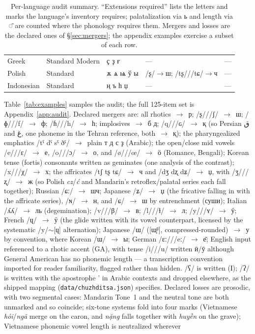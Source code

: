 \documentclass[11pt]{article}
\newcommand{\cz}[1]{{\chu #1}}
\newcommand{\ph}[1]{{\ipafont/#1/}}
\begin{document}
\begin{table}[ht]
\begin{tabular}{lllll}
Greek & Standard Modern & \cz{ҫ ҙ ғ} & — & — \\
Polish & Standard & \cz{ѫ ѧ ѩ ў ы} & \ph{ʂ}$\rightarrow$\cz{ш}; \ph{tʂ}/\ph{tɕ}$\rightarrow$\cz{ч} & — \\
Indonesian & Standard & \cz{ң ъ һ џ} & — & — \\
\bottomrule
\end{tabular}
\caption{Per-language audit summary. ``Extensions required'' lists the letters and marks the language's inventory requires; palatalization via \cz{ь} and length via \cz{◌̄} are counted where the phonology requires them. Mergers and losses are the declared ones of \S\ref{sec:mergers}; the appendix examples exercise a subset of each row.}
\label{tab:audit}
\end{table}
 Table~\ref{tab:examples} samples the audit; the full 125-item set is Appendix~\ref{app:audit}. Declared mergers\label{sec:mergers} are: all rhotics~$\rightarrow$~\cz{р}; \ph{ʂ}/\ph{ʃ}~$\rightarrow$~\cz{ш}; \ph{ɸ}/\ph{f}~$\rightarrow$~\cz{ф}; \ph{ɦ}/\ph{h}~$\rightarrow$~\cz{һ}; implosives~$\rightarrow$~\cz{б д}; \ph{q}/\ph{ɢ}~$\rightarrow$~\cz{қ} (so Persian {\ipafont ق} and {\ipafont غ}, one phoneme in the Tehran reference, both~$\rightarrow$~\cz{қ}); the pharyngealized emphatics \ph{tˤ dˤ sˤ ðˤ}~$\rightarrow$~plain \cz{т д с ҙ} (Arabic); the open/close mid vowels \ph{e}/\ph{ɛ}~$\rightarrow$~\cz{е}, \ph{o}/\ph{ɔ}~$\rightarrow$~\cz{о}, and \ph{ø}/\ph{œ}~$\rightarrow$~\cz{ӧ} (Romance, Bengali); Korean tense (fortis) consonants written as geminates (one analysis of the contrast); \ph{x}/\ph{χ}~$\rightarrow$~\cz{х}; the affricates \ph{tʃ tʂ tɕ}~$\rightarrow$~\cz{ч} and \ph{dʒ dʐ dʑ}~$\rightarrow$~\cz{џ}, with \ph{ʒ}/\ph{ʐ}~$\rightarrow$~\cz{ж} (so Polish \emph{cz}/\emph{ć} and Mandarin's retroflex/palatal series each fall together); Russian \ph{ɕː}~$\rightarrow$~\cz{шч}; Japanese \ph{ʑ}~$\rightarrow$~\cz{џ} (the fricative falling in with the affricate series), \ph{ɴ}~$\rightarrow$~\cz{н}, and \ph{ɕ}~$\rightarrow$~\cz{ш} by entrenchment (\cz{суши}); Italian \ph{ʎʎ}~$\rightarrow$~\cz{ль} (degemination); \ph{v}/\ph{β}~$\rightarrow$~\cz{в}; \ph{l}/\ph{ɫ}~$\rightarrow$~\cz{л}; \ph{y}/\ph{ʏ}~$\rightarrow$~\cz{ӱ}; French \ph{ɥ}~$\rightarrow$~\cz{ӱ} (the glide written with its vowel counterpart, licensed by the systematic \ph{y}$\sim$[ɥ] alternation); Japanese \ph{ɯ} ([ɯ̟ᵝ], compressed-rounded)~$\rightarrow$~\cz{у} by convention, where Korean \ph{ɯ}~$\rightarrow$~\cz{ы}; German \ph{ɛː}/\ph{eː}~$\rightarrow$~\cz{е̄}; English input referenced to a rhotic accent (GA), with tense \ph{i}/\ph{u} written \cz{ӣ}/\cz{ӯ} although General American has no phonemic length — a transcription convention imported for reader familiarity, flagged rather than hidden. \ph{ʕ} is written (\cz{Ӏ}); \ph{ʔ} is written with the apostrophe \cz{’} in Arabic contexts and dropped elsewhere, as the shipped mapping (\texttt{data/chuzhditsa.json}) specifies. Declared losses are prosodic, with two segmental cases: Mandarin Tone~1 and the neutral tone are both unmarked and so coincide; six-tone systems fold into four marks (Vietnamese \emph{hỏi}/\emph{ngã} merge on the caron, and \emph{nặng} falls together with \emph{huyền} on the grave); Vietnamese phonemic vowel length is neutralized wherever 
\end{document}
